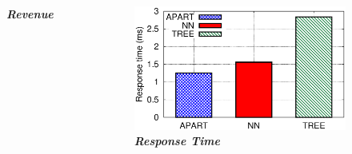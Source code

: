 \documentclass[t]{beamer}
\begin{document}
\begin{frame}
\begin{columns}
\begin{figure}
    \vspace{-0.08in}
    \small{\textit{\textbf{Revenue}}}
\end{figure}
\vspace{-0.1in}
\begin{figure}
	\centering
    \includegraphics[width = 0.95\columnwidth]{default_rp.eps}
    \vspace{-0.08in}
    \small{\textit{\textbf{Response Time}}}
\end{figure}
\end{columns}
\end{frame}
\end{document}
